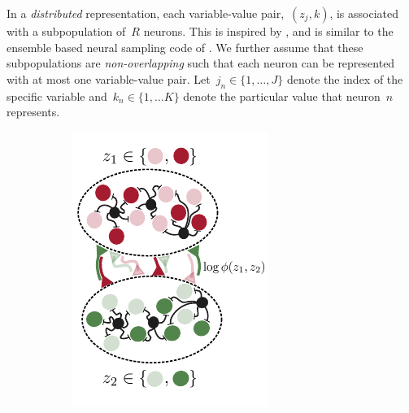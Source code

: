 In a \emph{distributed} representation, each variable-value
pair,~$(z_j,k)$, is associated with a subpopulation of~$R$
neurons. This is inspired by \citet{valiant1994circuits,
  valiant2005memorization}, and is similar to the ensemble based
neural sampling code of \citet{legenstein2014ensembles}.  We further
assume that these subpopulations are \emph{non-overlapping} such that
each neuron can be represented with at most one variable-value pair.
Let~${j_n \in \{1, \ldots, J\}}$ denote the index of the specific
variable and~$k_n \in \{1, \ldots K\}$ denote the particular
value that neuron~$n$ represents.


\begin{figure}[t!]
  \centering
  \begin{subfigure}[b]{1.6in}
    \centering
    \caption{}
    \vspace{-.3in}
    \includegraphics[width=\textwidth]{figures/ch7/example_population2.pdf}

\end{subfigure}
\end{figure}
